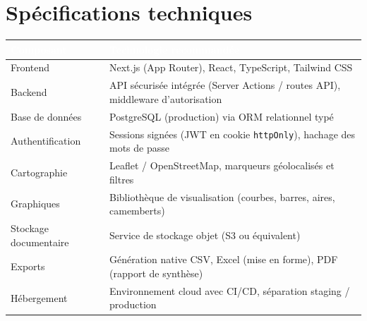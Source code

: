 \documentclass[11pt,a4paper]{article}
\begin{document}
\section{Spécifications techniques}
\begin{center}
\small
\renewcommand{\arraystretch}{1.15}
\begin{tabularx}{\textwidth}{@{}l Y@{}}
\toprule
{}
\textcolor{white}{\textbf{Composant}} & \textcolor{white}{\textbf{Technologie recommandée}} \\
\midrule
Frontend & Next.js (App Router), React, TypeScript, Tailwind CSS \\
 Backend & API sécurisée intégrée (Server Actions / routes API), middleware d'autorisation \\
Base de données & PostgreSQL (production) via ORM relationnel typé \\
 Authentification & Sessions signées (JWT en cookie \texttt{httpOnly}), hachage des mots de passe \\
Cartographie & Leaflet / OpenStreetMap, marqueurs géolocalisés et filtres \\
 Graphiques & Bibliothèque de visualisation (courbes, barres, aires, camemberts) \\
Stockage documentaire & Service de stockage objet (S3 ou équivalent) \\
 Exports & Génération native CSV, Excel (mise en forme), PDF (rapport de synthèse) \\
Hébergement & Environnement cloud avec CI/CD, séparation staging / production \\
\bottomrule
\end{tabularx}
\end{center}
\end{document}
